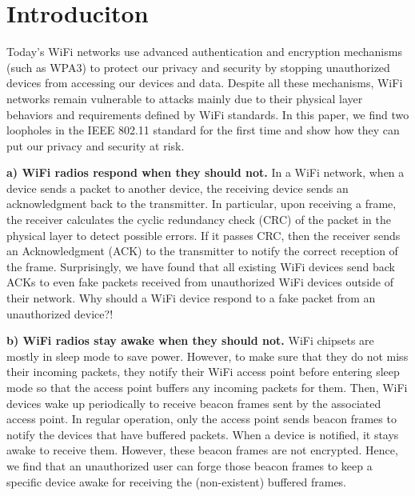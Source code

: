 \section{Introduciton}

Today's WiFi networks use advanced authentication and encryption mechanisms (such as WPA3) to protect our privacy and security by stopping unauthorized devices from accessing our devices and data. Despite all these mechanisms, WiFi networks remain vulnerable to attacks mainly due to their physical layer behaviors and requirements defined by WiFi standards. In this paper, we find two loopholes in the IEEE 802.11 standard for the first time and show how they can put our privacy and security at risk. 

\textbf{a) WiFi radios respond when they should not.}  In a WiFi network, when a device sends a packet to another device, the receiving device sends an acknowledgment back to the transmitter. In particular, upon receiving a frame, the receiver calculates the cyclic redundancy check (CRC) of the packet in the physical layer to detect possible errors. If it passes CRC, then the receiver sends an Acknowledgment (ACK) to the transmitter to notify the correct reception of the frame. Surprisingly, we have found that all existing WiFi devices send back ACKs to even fake packets received from unauthorized WiFi devices outside of their network. Why should a WiFi device respond to a fake packet from an unauthorized device?! 

\textbf{b) WiFi radios stay awake when they should not.}
WiFi chipsets are mostly in sleep mode to save power. However, to make sure that they do not miss their incoming packets, they notify their WiFi access point before entering sleep mode so that the access point buffers any incoming packets for them. Then, WiFi devices wake up periodically to receive beacon frames sent by the associated access point. In regular operation, only the access point sends beacon frames to notify the devices that have buffered packets. When a device is notified, it stays awake to receive them. However, these beacon frames are not encrypted. Hence, we find that an unauthorized user can forge those beacon frames to keep a specific device awake for receiving the (non-existent) buffered frames. %

